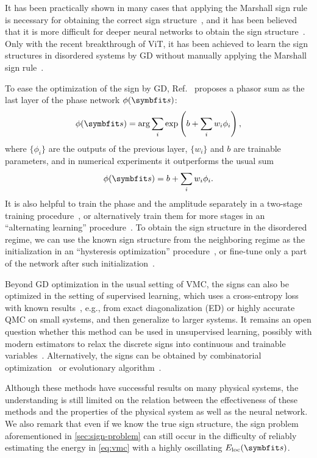 It has been practically shown in many cases that applying the Marshall sign rule is necessary for obtaining the correct sign structure~\cite{carleo2017solving, choo2019two, bukov2021learning, li2022bridging}, and it has been believed that it is more difficult for deeper neural networks to obtain the sign structure~\cite{szabo2020neural}. Only with the recent breakthrough of ViT, it has been achieved to learn the sign structures in disordered systems by GD without manually applying the Marshall sign rule~\cite{viteritti2023transformer, viteritti2023transformer2}.

To ease the optimization of the sign by GD, Ref.~\cite{szabo2020neural} proposes a phasor sum as the last layer of the phase network $\phi(\vs)$:
\begin{equation}
\phi(\vs) = \arg \sum_i \exp\left( b + \sum_i w_i \phi_i \right),
\label{eq:phasor-sum}
\end{equation}
where $\{\phi_i\}$ are the outputs of the previous layer, $\{w_i\}$ and $b$ are trainable parameters, and in numerical experiments it outperforms the usual sum
\begin{equation}
\phi(\vs) = b + \sum_i w_i \phi_i.
\end{equation}
It is also helpful to train the phase and the amplitude separately in a two-stage training procedure~\cite{szabo2020neural}, or alternatively train them for more stages in an ``alternating learning'' procedure~\cite{astrakhantsev2021broken}. To obtain the sign structure in the disordered regime, we can use the known sign structure from the neighboring regime as the initialization in an ``hysteresis optimization'' procedure~\cite{astrakhantsev2021broken}, or fine-tune only a part of the network after such initialization~\cite{rende2024fine}.

Beyond GD optimization in the usual setting of VMC, the signs can also be optimized in the setting of supervised learning, which uses a cross-entropy loss with known results~\cite{park2022expressive}, e.g., from exact diagonalization (ED) or highly accurate QMC on small systems, and then generalize to larger systems. It remains an open question whether this method can be used in unsupervised learning, possibly with modern estimators to relax the discrete signs into continuous and trainable variables~\cite{maddison2017concrete, jang2017categorical, tucker2017rebar, grathwohl2018backpropagation}. Alternatively, the signs can be obtained by combinatorial optimization~\cite{westerhout2023many} or evolutionary algorithm~\cite{chen2022neural}.

Although these methods have successful results on many physical systems, the understanding is still limited on the relation between the effectiveness of these methods and the properties of the physical system as well as the neural network. We also remark that even if we know the true sign structure, the sign problem aforementioned in \cref{sec:sign-problem} can still occur in the difficulty of reliably estimating the energy in \cref{eq:vmc} with a highly oscillating $E_\text{loc}(\vs)$.
